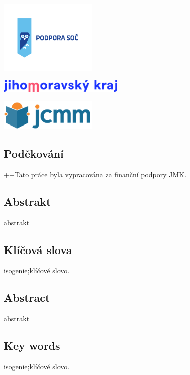 \documentclass[12pt]{report}
\begin{document}
\newpage
\thispagestyle{empty}
\begin{center}
\includegraphics[width=0.35\textwidth]{podpora_soc-horizontalni.png}
\end{center}
\vspace*{1.5cm}
\begin{center}
\includegraphics[width=0.45\textwidth]{logo_JMK_pruhledne.png}
\end{center}
\vspace*{2.2cm}
\begin{center}
\includegraphics[width=0.35\textwidth]{jcmm-logotype-positive1.png}
\end{center}
\vspace*{6.5cm}
\subsection*{Poděkování}
++Tato práce byla vypracována za finanční podpory JMK.


\newpage
\thispagestyle{empty}
\subsection*{Abstrakt}
abstrakt


\subsection*{Klíčová slova}
isogenie;klíčové slovo.


\vspace*{4cm}

\subsection*{Abstract}
abstrakt

\subsection*{Key words}
isogenie;klíčové slovo.
\end{document}
